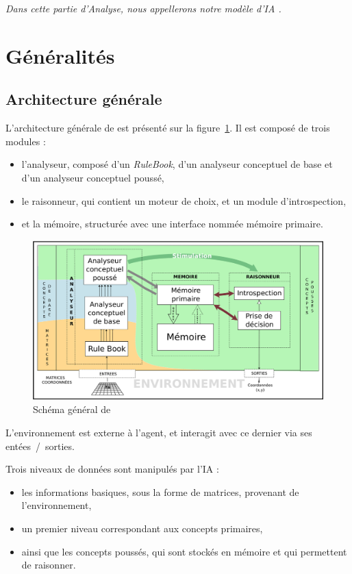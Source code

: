 \emph{Dans cette partie d'Analyse, nous appellerons notre modèle d'IA \cogito{}.}

\section{Généralités}

\subsection{Architecture générale}
\label{subsection_architecture_generale}
L'architecture générale de \cogito{} est présenté sur la figure~\ref{schema_general}. Il est composé de trois modules :
\begin{itemize}
\item l'analyseur, composé d'un \emph{RuleBook}, d'un analyseur conceptuel de base et d'un analyseur conceptuel poussé,
\item le raisonneur, qui contient un moteur de choix, et un module d'introspection,
\item et la mémoire, structurée avec une interface nommée mémoire primaire.
\end{itemize}

\begin{figure}[H] 
\includegraphics[width=\textwidth]{files/simplified_general_diagram} 
\caption{Schéma général de \cogito{}} 
\label{schema_general}
\end{figure}

L'environnement est externe à l'agent, et interagit avec ce dernier via ses entées~/~sorties.

Trois niveaux de données sont manipulés par l'IA :
\begin{itemize}
\item les informations basiques, sous la forme de matrices, provenant de l'environnement,
\item un premier niveau correspondant aux concepts primaires,
\item ainsi que les concepts poussés, qui sont stockés en mémoire et qui permettent de raisonner.
\end{itemize}

